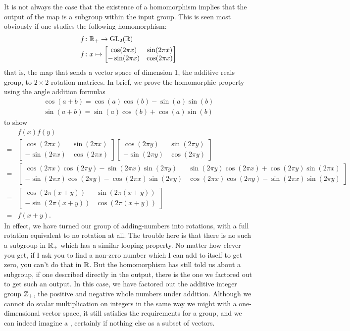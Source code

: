 \documentclass[11pt]{article}
\begin{document}
It is not always the case that the existence of a homomorphism implies that the output of the map is a subgroup within the input group. This is seen most obviously if one studies the following homomorphism: \begin{align*}
f\colon & \mathbb{R}_+ \to \mathrm{GL}_2(\mathbb{R}) \\
f\colon & x \mapsto \begin{bmatrix} \cos(2\pi x) & \sin(2\pi x) \\ -\sin(2\pi x) & \cos(2\pi x) \end{bmatrix}
\end{align*}
that is, the map that sends a vector space of dimension 1, the additive reals group, to $2\times 2$ rotation matrices. In brief, we prove the homomorphic property using the angle addition formulas \begin{gather*}
\cos(a + b) = \cos(a) \cos(b) - \sin(a) \sin(b) \\
\sin(a + b) = \sin(a) \cos(b) + \cos(a) \sin(b)
\end{gather*}
to show
\begin{align*}
&f(x)f(y) \\
=&\begin{bmatrix} \cos(2\pi x) & \sin(2\pi x) \\ -\sin(2\pi x) & \cos(2\pi x) \end{bmatrix}
\begin{bmatrix} \cos(2\pi y) & \sin(2\pi y) \\ -\sin(2\pi y) & \cos(2\pi y) \end{bmatrix} \\
=& \begin{bmatrix} \cos(2\pi x) \cos(2\pi y) - \sin(2 \pi x) \sin(2\pi y) &
\sin(2\pi y) \cos(2\pi x) + \cos(2 \pi y) \sin(2\pi x) \\
- \sin(2\pi x) \cos(2\pi y) - \cos(2 \pi x) \sin(2\pi y) &
\cos(2\pi x) \cos(2\pi y) - \sin(2 \pi x) \sin(2\pi y)
\end{bmatrix} \\
=& \begin{bmatrix} \cos(2\pi (x + y)) & \sin(2\pi (x + y)) \\ -\sin(2\pi (x + y)) & \cos(2\pi (x + y)) \end{bmatrix} \\
=& f(x+y).
\end{align*}
In effect, we have turned our group of adding-numbers into rotations, with a full rotation equivalent to no rotation at all. The trouble here is that there is no such a subgroup in $\mathbb{R}_+$ which has a similar looping property. No matter how clever you get, if I ask you to find a non-zero number which I can add to itself to get zero, you can't do that in $\mathbb{R}$. But the homomorphism has still told us about a subgroup, if one described directly in the output, there is the one we factored out to get such an output. In this case, we have factored out the additive integer group $\mathbb{Z}_+$, the positive and negative whole numbers under addition. Although we cannot do scalar multiplication on integers in the same way we might with a one-dimensional vector space, it still satisfies the requirements for a group, and we can indeed imagine a , certainly if nothing else as a subset of vectors.
\end{document}
